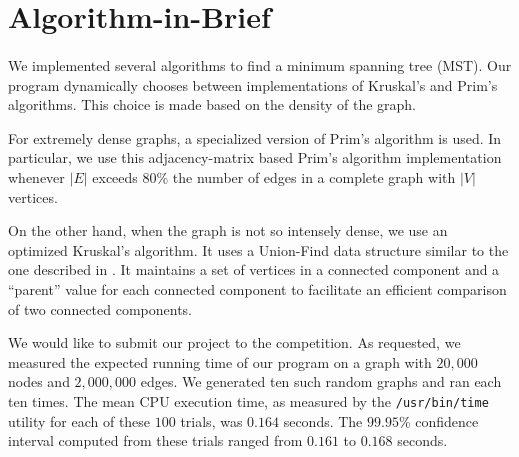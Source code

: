 \section{Algorithm-in-Brief}
\label{sec:algbrief}

\paragraph{}
We implemented several algorithms to find a minimum spanning tree (MST).  Our
program dynamically chooses between implementations of Kruskal's and Prim's
algorithms.  This choice is made based on the density of the graph.

For extremely dense graphs, a specialized version of Prim's algorithm is used.
In particular, we use this adjacency-matrix based Prim's algorithm
implementation whenever $|E|$ exceeds $80$\% the number of edges in a complete
graph with $|V|$ vertices.

On the other hand, when the graph is not so intensely dense, we use an optimized
Kruskal's algorithm.  It uses a Union-Find data structure similar to the one
described in \cite{algdesign}.  It maintains a set of vertices in a connected
component and a ``parent'' value for each connected component to facilitate an
efficient comparison of two connected components.

We would like to submit our project to the competition. As requested, we
measured the expected running time of our program on a graph with $20,000$ nodes
and $2,000,000$ edges.  We generated ten such random graphs and ran each ten
times.  The mean CPU execution time, as measured by the \texttt{/usr/bin/time}
utility for each of these $100$ trials, was $0.164$ seconds.  The $99.95\%$
confidence interval computed from these trials ranged from $0.161$ to $0.168$
seconds.
